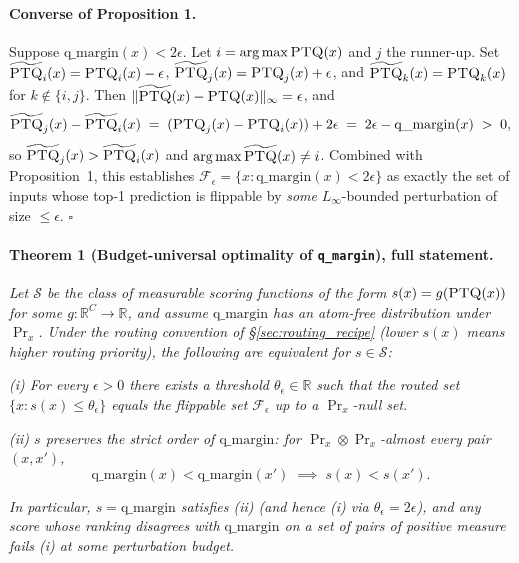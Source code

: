\documentclass{article}
\newcommand{\ptq}{\textsc{PTQ}\xspace}
\begin{document}
\paragraph{Converse of Proposition 1.}
Suppose $\mathrm{q\_margin}(x) < 2\epsilon$. Let $i = \arg\max\ptq(x)$ and $j$ the runner-up. Set $\widetilde{\ptq}_i(x) = \ptq_i(x) - \epsilon$, $\widetilde{\ptq}_j(x) = \ptq_j(x) + \epsilon$, and $\widetilde{\ptq}_k(x) = \ptq_k(x)$ for $k \notin \{i, j\}$. Then $\|\widetilde{\ptq}(x) - \ptq(x)\|_\infty = \epsilon$, and
\[
\widetilde{\ptq}_j(x) - \widetilde{\ptq}_i(x) \;=\; (\ptq_j(x) - \ptq_i(x)) + 2\epsilon \;=\; 2\epsilon - \mathrm{q\_margin}(x) \;>\; 0,
\]
so $\widetilde{\ptq}_j(x) > \widetilde{\ptq}_i(x)$ and $\arg\max\widetilde{\ptq}(x) \neq i$. Combined with Proposition~1, this establishes $\mathcal F_\epsilon = \{x : \mathrm{q\_margin}(x) < 2\epsilon\}$ as exactly the set of inputs whose top-1 prediction is flippable by \emph{some} $L_\infty$-bounded perturbation of size $\leq \epsilon$. \hfill$\square$

\paragraph{Theorem 1 (Budget-universal optimality of \texttt{q\_margin}), full statement.}
\emph{Let $\mathcal S$ be the class of measurable scoring functions of the form $s(x) = g(\ptq(x))$ for some $g : \mathbb R^C \to \mathbb R$, and assume $\mathrm{q\_margin}$ has an atom-free distribution under $\Pr_x$. Under the routing convention of \S\ref{sec:routing_recipe} (lower $s(x)$ means higher routing priority), the following are equivalent for $s \in \mathcal S$:}

\emph{(i) For every $\epsilon > 0$ there exists a threshold $\theta_\epsilon \in \mathbb R$ such that the routed set $\{x : s(x) \leq \theta_\epsilon\}$ equals the flippable set $\mathcal F_\epsilon$ up to a $\Pr_x$-null set.}

\emph{(ii) $s$ preserves the strict order of $\mathrm{q\_margin}$: for $\Pr_x \otimes \Pr_x$-almost every pair $(x, x')$,
\[
\mathrm{q\_margin}(x) < \mathrm{q\_margin}(x') \;\implies\; s(x) < s(x').
\]
}

\emph{In particular, $s = \mathrm{q\_margin}$ satisfies (ii) (and hence (i) via $\theta_\epsilon = 2\epsilon$), and any score whose ranking disagrees with $\mathrm{q\_margin}$ on a set of pairs of positive measure fails (i) at some perturbation budget.}
\end{document}
